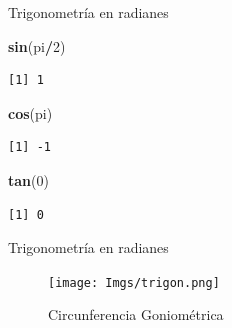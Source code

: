 \documentclass[
  ignorenonframetext,
]{beamer}
\newenvironment{Shaded}{\begin{snugshade}}{\end{snugshade}}
\newcommand{\DecValTok}[1]{\textcolor[rgb]{0.00,0.00,0.81}{#1}}
\newcommand{\KeywordTok}[1]{\textcolor[rgb]{0.13,0.29,0.53}{\textbf{#1}}}
\newcommand{\NormalTok}[1]{#1}
\newcommand{\OperatorTok}[1]{\textcolor[rgb]{0.81,0.36,0.00}{\textbf{#1}}}
\begin{document}
\begin{frame}[fragile]{Trigonometría en radianes}
\protect\hypertarget{trigonometruxeda-en-radianes-1}{}

\begin{Shaded}
\begin{Highlighting}[]
\KeywordTok{sin}\NormalTok{(pi}\OperatorTok{/}\DecValTok{2}\NormalTok{)}
\end{Highlighting}
\end{Shaded}

\begin{verbatim}
[1] 1
\end{verbatim}

\begin{Shaded}
\begin{Highlighting}[]
\KeywordTok{cos}\NormalTok{(pi)}
\end{Highlighting}
\end{Shaded}

\begin{verbatim}
[1] -1
\end{verbatim}

\begin{Shaded}
\begin{Highlighting}[]
\KeywordTok{tan}\NormalTok{(}\DecValTok{0}\NormalTok{)}
\end{Highlighting}
\end{Shaded}

\begin{verbatim}
[1] 0
\end{verbatim}

\end{frame}

\begin{frame}{Trigonometría en radianes}
\protect\hypertarget{trigonometruxeda-en-radianes-2}{}

\begin{figure}
\centering
\texttt{[image: Imgs/trigon.png]}
\caption{Circunferencia Goniométrica}
\end{figure}

\end{frame}
\end{document}
